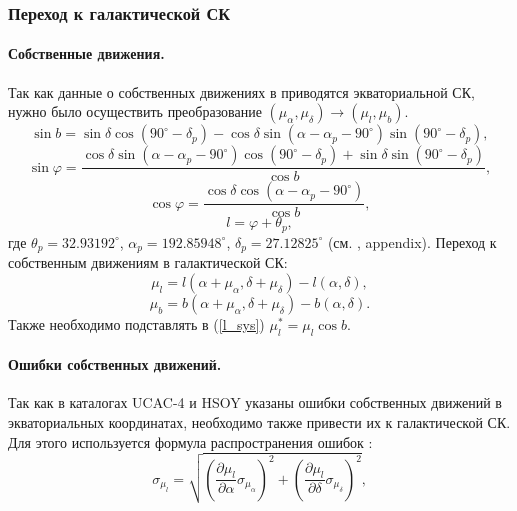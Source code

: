 \documentclass{matmex-diploma-custom}
\begin{document}
\pagebreak
\subsubsection{Переход к галактической СК}
\par \paragraph{Собственные движения.} 
Так как данные о собственных движениях в приводятся экваториальной СК, нужно было осуществить преобразование $(\mu_{\alpha}, \mu_{\delta}) \rightarrow (\mu_l, \mu_b)$.
\begin{equation}
        \sin{b} = \sin{\delta} \cos(90^{\circ} - \delta_p) - \cos{\delta} \sin(\alpha - \alpha_p - 90^{\circ}) \sin(90^{\circ} - \delta_p),
\end{equation}
\begin{equation}
        \sin{\varphi} = \frac{\cos{\delta} \sin(\alpha - \alpha_p - 90^{\circ}) \cos(90^{\circ} - \delta_p) + \sin{\delta} \sin(90^{\circ} - \delta_p)}{\cos{b}},
\end{equation}
\begin{equation}
        \cos{\varphi} = \frac{ \cos{\delta} \cos(\alpha - \alpha_p - 90^{\circ})}{\cos{b}},
\end{equation}
\begin{equation}
        l = \varphi + \theta_p,
\end{equation}
где $\theta_p = 32.93192^{\circ}$, $\alpha_p = 192.85948^{\circ}$, $\delta_p = 27.12825^{\circ}$ (см. \cite{ReidSolo}, appendix). Переход к собственным движениям в галактической СК:
\begin{equation}
        \mu_l = l(\alpha + \mu_{\alpha}, \delta + \mu_{\delta}) - l(\alpha, \delta),
\end{equation}
\begin{equation}
        \mu_b = b(\alpha + \mu_{\alpha}, \delta + \mu_{\delta}) - b(\alpha, \delta).
\end{equation}
Также необходимо подставлять в (\ref{l_sys}) $\mu_l^* = \mu_l \cos{b}$.

\pagebreak
\par \paragraph{Ошибки собственных движений.} 
\par Так как в каталогах UCAC-4 и HSOY указаны ошибки собственных движений в экваториальных координатах, необходимо также привести их к галактической СК. Для этого используется формула распространения ошибок \cite{Agekyan}:
\begin{equation}
        \sigma_{\mu_l} = \sqrt{\left(\frac{\partial \mu_l}{\partial \alpha} \sigma_{\mu_{\alpha}} \right)^2 + \left(\frac{\partial \mu_l}{\partial\delta} \sigma_{\mu_{\delta}} \right)^2},
\end{equation}
\end{document}
